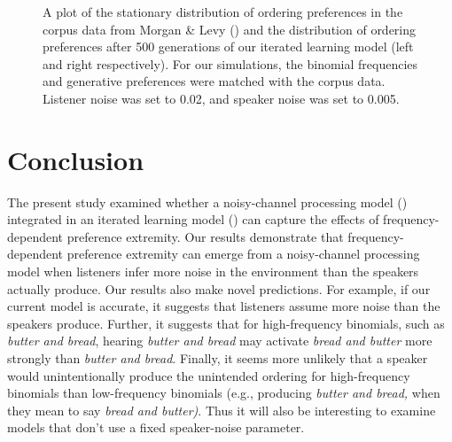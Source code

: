 \documentclass[
  12pt,
  letterpaper,
]{scrreport}
\begin{document}
\begin{figure}[htbp]

\caption{\label{fig-corpusourmodel}A plot of the stationary distribution
of ordering preferences in the corpus data from Morgan \& Levy
() and the distribution of ordering
preferences after 500 generations of our iterated learning model (left
and right respectively). For our simulations, the binomial frequencies
and generative preferences were matched with the corpus data. Listener
noise was set to 0.02, and speaker noise was set to 0.005.}


\end{figure}%

\section{Conclusion}\label{conclusion-3}

The present study examined whether a noisy-channel processing model
() integrated in an iterated learning model
() can capture the effects of frequency-dependent
preference extremity. Our results demonstrate that frequency-dependent
preference extremity can emerge from a noisy-channel processing model
when listeners infer more noise in the environment than the speakers
actually produce. Our results also make novel predictions. For example,
if our current model is accurate, it suggests that listeners assume more
noise than the speakers produce. Further, it suggests that for
high-frequency binomials, such as \emph{butter and bread}, hearing
\emph{butter and bread} may activate \emph{bread and butter} more
strongly than \emph{butter and bread}. Finally, it seems more unlikely
that a speaker would unintentionally produce the unintended ordering for
high-frequency binomials than low-frequency binomials (e.g., producing
\emph{butter and bread,} when they mean to say \emph{bread and butter)}.
Thus it will also be interesting to examine models that don't use a
fixed speaker-noise parameter.
\end{document}
